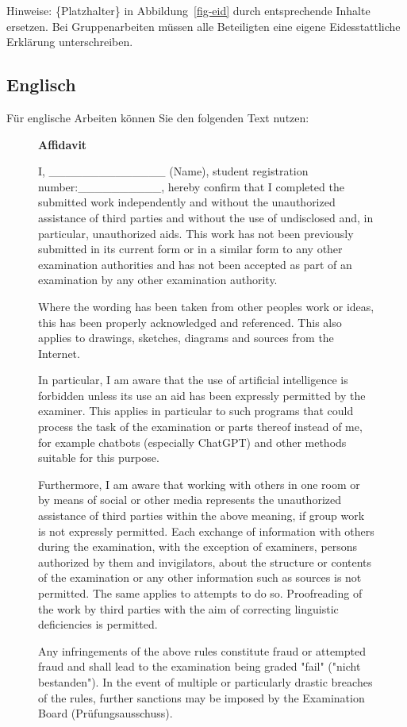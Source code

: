 \documentclass[
  letterpaper,
  DIV=11]{scrreprt}
\begin{document}
Hinweise: \{Platzhalter\} in Abbildung~\ref{fig-eid} durch entsprechende
Inhalte ersetzen. Bei Gruppenarbeiten müssen alle Beteiligten eine
eigene Eidesstattliche Erklärung unterschreiben.

\subsection{Englisch}\label{englisch}

Für englische Arbeiten können Sie den folgenden Text nutzen:

\begin{figure}

\textbf{Affidavit}

I, \_\_\_\_\_\_\_\_\_\_\_\_\_\_ (Name), student registration
number:\_\_\_\_\_\_\_\_\_\_, hereby confirm that I completed the
submitted work independently and without the unauthorized assistance of
third parties and without the use of undisclosed and, in particular,
unauthorized aids. This work has not been previously submitted in its
current form or in a similar form to any other examination authorities
and has not been accepted as part of an examination by any other
examination authority.

Where the wording has been taken from other people\textquotesingle s
work or ideas, this has been properly acknowledged and referenced. This
also applies to drawings, sketches, diagrams and sources from the
Internet.

In particular, I am aware that the use of artificial intelligence is
forbidden unless its use an aid has been expressly permitted by the
examiner. This applies in particular to such programs that could process
the task of the examination or parts thereof instead of me, for example
chatbots (especially ChatGPT) and other methods suitable for this
purpose.

Furthermore, I am aware that working with others in one room or by means
of social or other media represents the unauthorized assistance of third
parties within the above meaning, if group work is not expressly
permitted. Each exchange of information with others during the
examination, with the exception of examiners, persons authorized by them
and invigilators, about the structure or contents of the examination or
any other information such as sources is not permitted. The same applies
to attempts to do so. Proofreading of the work by third parties with the
aim of correcting linguistic deficiencies is permitted.

Any infringements of the above rules constitute fraud or attempted fraud
and shall lead to the examination being graded "fail" ("nicht
bestanden"). In the event of multiple or particularly drastic breaches
of the rules, further sanctions may be imposed by the Examination Board
(Prüfungsausschuss).


\end{figure}
\end{document}
